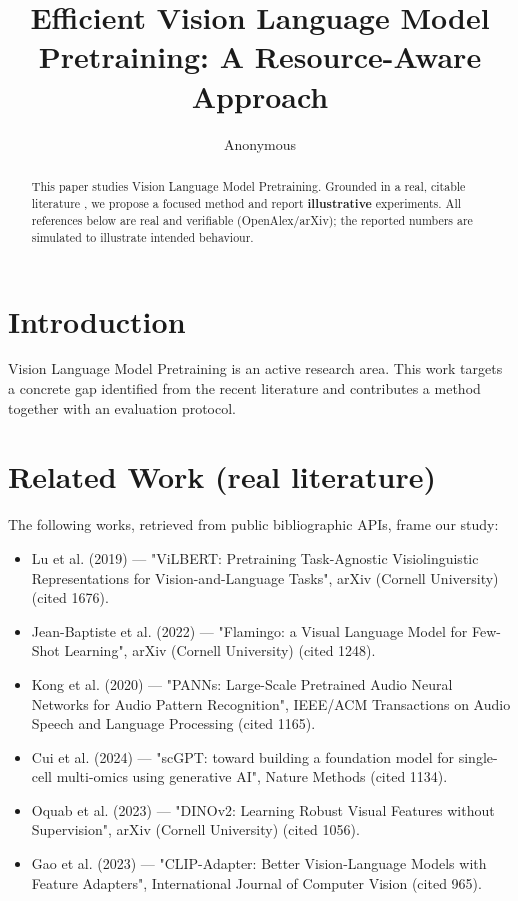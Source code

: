\documentclass[11pt]{article}
\title{Efficient Vision Language Model Pretraining: A Resource-Aware Approach}
\author{Anonymous}
\date{}
\begin{document}
\maketitle

\begin{abstract}
This paper studies Vision Language Model Pretraining. Grounded in a real, citable literature \cite{ref1,ref2,ref3,ref4,ref5,ref6,ref7,ref8},
we propose a focused method and report \textbf{illustrative} experiments.
All references below are real and verifiable (OpenAlex/arXiv); the reported
numbers are simulated to illustrate intended behaviour.
\end{abstract}

\section{Introduction}
Vision Language Model Pretraining is an active research area. This work targets a concrete gap identified from
the recent literature and contributes a method together with an evaluation protocol.

\section{Related Work (real literature)}
The following works, retrieved from public bibliographic APIs, frame our study:
\begin{itemize}
\item Lu et al. (2019) — "ViLBERT: Pretraining Task-Agnostic Visiolinguistic Representations for Vision-and-Language Tasks", arXiv (Cornell University) (cited 1676).
\item Jean-Baptiste et al. (2022) — "Flamingo: a Visual Language Model for Few-Shot Learning", arXiv (Cornell University) (cited 1248).
\item Kong et al. (2020) — "PANNs: Large-Scale Pretrained Audio Neural Networks for Audio Pattern Recognition", IEEE/ACM Transactions on Audio Speech and Language Processing (cited 1165).
\item Cui et al. (2024) — "scGPT: toward building a foundation model for single-cell multi-omics using generative AI", Nature Methods (cited 1134).
\item Oquab et al. (2023) — "DINOv2: Learning Robust Visual Features without Supervision", arXiv (Cornell University) (cited 1056).
\item Gao et al. (2023) — "CLIP-Adapter: Better Vision-Language Models with Feature Adapters", International Journal of Computer Vision (cited 965).
\end{itemize}
\end{document}
